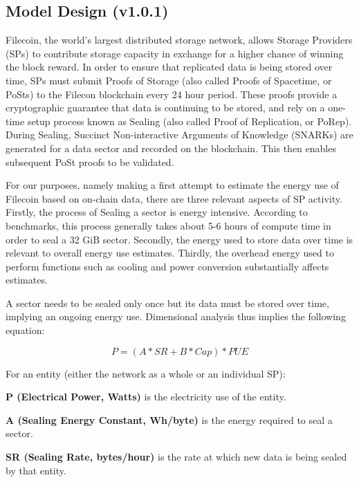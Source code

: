 \documentclass[9pt, oneside]{article}   	%
\begin{document}
\begin{multicols}{2}
\setlength{\parskip}{0.1\baselineskip} %
\section{Model Design (v1.0.1)}

Filecoin, the world’s largest distributed storage network, allows Storage Providers (SPs) to contribute storage capacity in exchange for a higher chance of winning the block reward. In order to ensure that replicated data is being stored over time, SPs must submit Proofs of Storage (also called Proofs of Spacetime, or PoSts) to the Filecon blockchain every 24 hour period. These proofs provide a cryptographic guarantee that data is continuing to be stored, and rely on a one-time setup process known as Sealing (also called Proof of Replication, or PoRep). During Sealing, Succinct Non-interactive Arguments of Knowledge (SNARKs) are generated for a data sector and recorded on the blockchain. This then enables subsequent PoSt proofs to be validated.

For our purposes, namely making a first attempt to estimate the energy use of Filecoin based on on-chain data, there are three relevant aspects of SP activity. Firstly, the process of Sealing a sector is energy intensive. According to benchmarks, this process generally takes about 5-6 hours of compute time in order to seal a 32 GiB sector. Secondly, the energy used to store data over time is relevant to overall energy use estimates. Thirdly, the overhead energy used to perform functions such as cooling and power conversion substantially affects estimates.

A sector needs to be sealed only once but its data must be stored over time, implying an ongoing energy use. Dimensional analysis thus implies the following equation:

\[
P = ( A * SR + B * Cap) * PUE
 \tag{Equation 1}
 \label{estimateEq}
\]

For an entity (either the network as a whole or an individual SP):

\textbf{P (Electrical Power, Watts)} is the electricity use of the entity.

\textbf{A (Sealing Energy Constant, Wh/byte)} is the energy required to seal a sector.

\textbf{SR (Sealing Rate, bytes/hour)} is the rate at which new data is being sealed by that entity.


\end{multicols}
\end{document}
